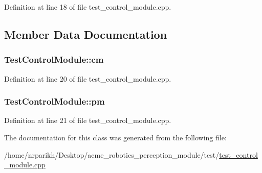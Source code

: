 Definition at line 18 of file test\+\_\+control\+\_\+module.\+cpp.



\subsection{Member Data Documentation}
\subsubsection[{\texorpdfstring{cm}{cm}}]{ Test\+Control\+Module\+::cm\hspace{0.3cm}{\ttfamily [protected]}}\hypertarget{class_test_control_module_a8b31203bb99dac1486c80c5c270673a3}{}\label{class_test_control_module_a8b31203bb99dac1486c80c5c270673a3}


Definition at line 20 of file test\+\_\+control\+\_\+module.\+cpp.

\subsubsection[{\texorpdfstring{pm}{pm}}]{ Test\+Control\+Module\+::pm\hspace{0.3cm}{\ttfamily [protected]}}\hypertarget{class_test_control_module_ad498100deff15c962c1d6e933901f7cf}{}\label{class_test_control_module_ad498100deff15c962c1d6e933901f7cf}


Definition at line 21 of file test\+\_\+control\+\_\+module.\+cpp.



The documentation for this class was generated from the following file\+:\begin{DoxyCompactItemize}
\item 
/home/nrparikh/\+Desktop/acme\+\_\+robotics\+\_\+perception\+\_\+module/test/\hyperlink{test__control__module_8cpp}{test\+\_\+control\+\_\+module.\+cpp}\end{DoxyCompactItemize}
